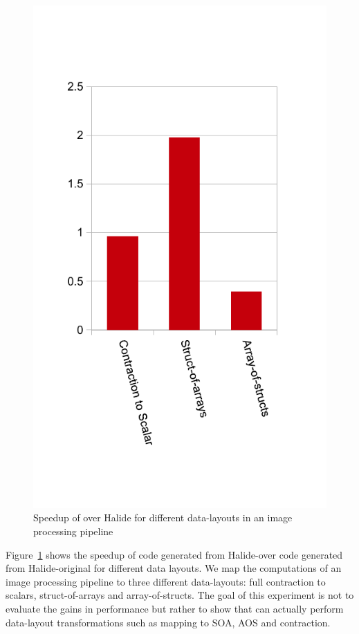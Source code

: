 \begin{figure}
\centering
 \includegraphics[scale=0.7]{./figures/perf2.pdf}
 \caption{Speedup of \framework over Halide for different data-layouts in an image processing pipeline}
 \label{fig:speedup2}
\end{figure}

Figure~\ref{fig:speedup2} shows the speedup of code generated from Halide-\framework over code generated from Halide-original for different data layouts.  We map the computations of an image processing pipeline to three different data-layouts: full contraction to scalars, struct-of-arrays and array-of-structs.  The goal of this experiment is not to evaluate the gains in performance but rather to show that \framework can actually perform data-layout transformations such as mapping to SOA, AOS and contraction.

